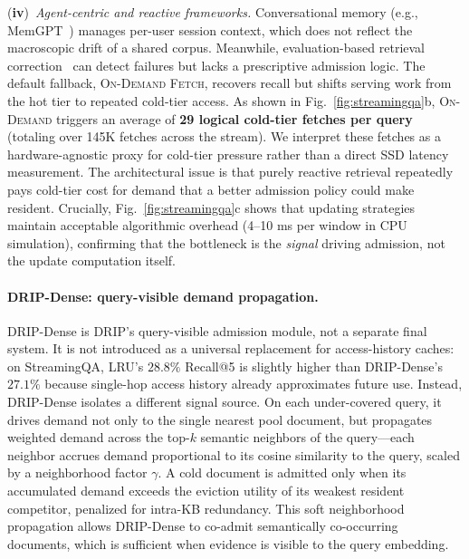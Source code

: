 (\textbf{iv})~\emph{Agent-centric and reactive frameworks.} Conversational memory (e.g., MemGPT~\cite{packer2023memgpt}) manages per-user session context, which does not reflect the macroscopic drift of a shared corpus. Meanwhile, evaluation-based retrieval correction~\cite{yan2024crag,peng2025uaeval4rag} can detect failures but lacks a prescriptive admission logic. The default fallback, \textsc{On-Demand Fetch}, recovers recall but shifts serving work from the hot tier to repeated cold-tier access. As shown in Fig.~\ref{fig:streamingqa}b, \textsc{On-Demand} triggers an average of \textbf{29 logical cold-tier fetches per query} (totaling over 145K fetches across the stream). We interpret these fetches as a hardware-agnostic proxy for cold-tier pressure rather than a direct SSD latency measurement. The architectural issue is that purely reactive retrieval repeatedly pays cold-tier cost for demand that a better admission policy could make resident. Crucially, Fig.~\ref{fig:streamingqa}c shows that updating strategies maintain acceptable algorithmic overhead (4--10 ms per window in CPU simulation), confirming that the bottleneck is the \emph{signal} driving admission, not the update computation itself.


\paragraph{DRIP-Dense: query-visible demand propagation.} DRIP-Dense is DRIP's query-visible admission module, not a separate final system. It is not introduced as a universal replacement for access-history caches: on StreamingQA, \textsc{LRU}'s $28.8\%$ Recall@5 is slightly higher than DRIP-Dense's $27.1\%$ because single-hop access history already approximates future use. Instead, DRIP-Dense isolates a different signal source. On each under-covered query, it drives demand not only to the single nearest pool document, but propagates weighted demand across the top-$k$ semantic neighbors of the query---each neighbor accrues demand proportional to its cosine similarity to the query, scaled by a neighborhood factor $\gamma$. A cold document is admitted only when its accumulated demand exceeds the eviction utility of its weakest resident competitor, penalized for intra-KB redundancy. This soft neighborhood propagation allows DRIP-Dense to co-admit semantically co-occurring documents, which is sufficient when evidence is visible to the query embedding.

